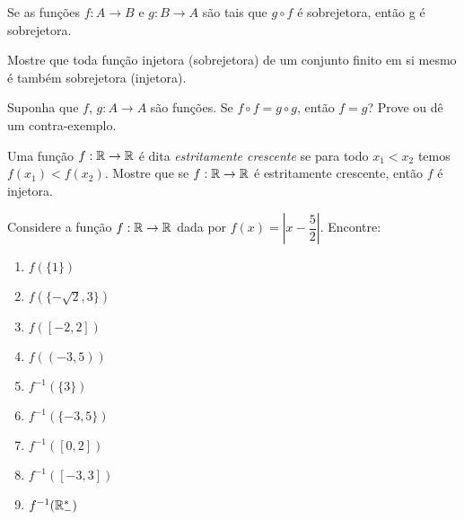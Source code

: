 \documentclass[12pt]{exam}
\begin{document}
    \vspace{.3cm}

    \questao{} Se as funç{õ}es $f : A \to B$ e $g : B\to A$ são
    tais que $g\circ f$ é sobrejetora, então g é sobrejetora.

    \vspace{.3cm}

    \questao{} Mostre que toda função injetora (sobrejetora) de um conjunto finito em si mesmo é também sobrejetora (injetora).

    \vspace{.3cm}

    \questao{} Suponha que $f$, $g : A \to A$ são funções. Se $f \circ f = g \circ g$, então $f = g$? Prove ou dê um contra-exemplo.

    \vspace{.3cm}

    \questao{} Uma função $f : \mathbb{R} \to \mathbb{R}$ é dita \textit{estritamente crescente} se para todo $x_1 < x_2$ temos $f(x_1) < f(x_2)$. Mostre que se $f : \mathbb{R} \to \mathbb{R}$ é estritamente crescente, então $f$ é injetora.

    \vspace{.3cm}

    \questao{} Considere a função $f : \mathbb{R} \to \mathbb{R}$ dada por $f(x) = \left| x - \dfrac{5}{2}\right|$. Encontre:
    \begin{multicols}{3}
        \begin{enumerate}[label={\alph*})]
            \item $f(\{1\})$

            \item $f(\{-\sqrt{2}, 3\})$

            \item $f([-2,2])$

            \item $f((-3,5))$

            \item $f^{-1}(\{3\})$

            \item $f^{-1}(\{-3,5\})$

            \item $f^{-1}([0,2])$

            \item $f^{-1}([-3,3])$

            \item $f^{-1}(\mathbb{R}^*_-)$
        \end{enumerate}
    \end{multicols}
\end{document}
